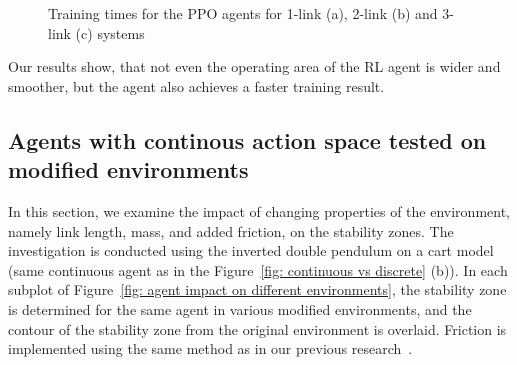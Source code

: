 \begin{figure}[h!]
	\caption{Training times for the PPO agents for 1-link (a), 2-link (b) and 3-link (c) systems}
	\label{fig: training time comparison}
\end{figure}

Our results show, that not even the operating area of the RL agent is wider and smoother, but the agent also achieves a faster training result. 

\subsection{Agents with continous action space tested on modified environments} \label{subsec: Agent tested on modified environments}

In this section, we examine the impact of changing properties of the environment, namely
link length, mass, and added friction, on the stability zones. The investigation is conducted
using the inverted double pendulum on a cart model (same continuous agent as in the Figure~\ref{fig: continuous vs discrete} (b)). In each subplot of Figure~\ref{fig: agent impact on different environments}, the stability zone is determined for the same agent in various modified environments, and the contour of the stability zone from the original environment is overlaid. Friction is implemented using the same method as in our previous research~\cite{manzl2023relrl}.

